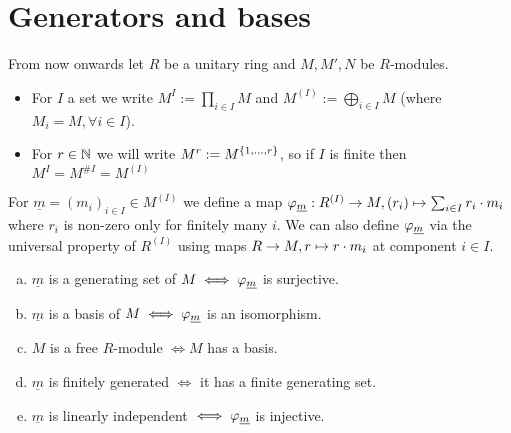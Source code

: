 \documentclass[a4paper]{report}
\begin{document}
\section{Generators and bases}
From now onwards let $R$ be a unitary ring and $M, M', N$ be $R$-modules.
\begin{nota*}
  \begin{itemize}
    \item For $I$ a set we write $M^{I}:= \prod_{i \in I}M$ and $M^{(I)}:= \bigoplus_{i \in I}M$ (where $M_{i} = M, \forall i \in I$).
          \item For $r \in \mathbb{N}$ we will write $M^{r}:= M^{\{1, \ldots, r\}}$, so if $I$ is finite then $M^{I} = M^{\#I} = M^{(I)}$
  \end{itemize}
\end{nota*}

\begin{defi} %
  For $\underline m = (m_{i})_{i \in I} \in M^{(I)}$ we define a map $\varphi_{\underline m}: R^{(I)} \to M, (r_{i}) \mapsto \sum_{i \in I}r_{i} \cdot m_{i}$ where $r_{i}$ is non-zero only for finitely many $i$. %
  We can also define $\varphi_{\underline m}$ via the universal property of $R^{(I)}$ using maps $R \to M, r \mapsto r \cdot m_{i}$ at component $i \in I$. %
  \begin{enumerate}[(a)]
    \item $\underline m$ is a generating set of $M \iff \varphi_{\underline m}$ is surjective.
    \item $\underline m$ is a basis of $M \iff \varphi_{\underline m}$ is an isomorphism.
    \item $M$ is a free $R$-module $\iff M$ has a basis.
    \item $\underline m$ is finitely generated $\iff$ it has a finite generating set.
    \item $\underline m$ is linearly independent $\iff \varphi_{\underline m}$ is injective.
  \end{enumerate}
\end{defi}
\end{document}
